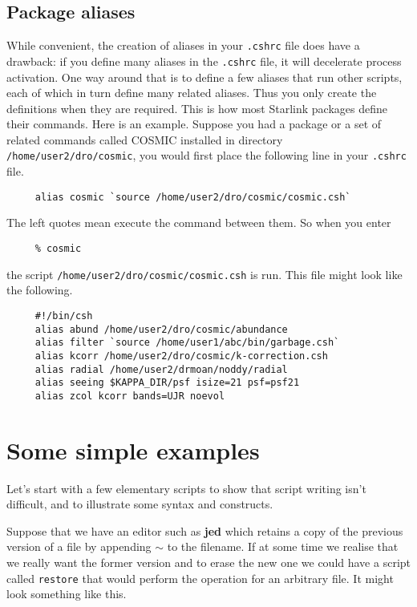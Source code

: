 \documentclass[twoside,11pt]{article}
\newcommand{\htmlref}[2]{#1}
\newcommand{\xlabel}[1]{}
\begin{document}
\subsection{\xlabel{sc4_se_package}Package aliases\label{sc4_se_package}}

While convenient, the creation of aliases in your {\tt .cshrc} file
does have a drawback: if you define many aliases in the {\tt .cshrc}
file, it will decelerate \htmlref{{\sf process}}{sc4_gl_pro} activation.
One way around that is to define a few aliases that run other scripts,
each of which in turn define many related aliases.  Thus you only
create the definitions when they are required.  This is how most
Starlink packages define their commands.  Here is an example.  Suppose
you had a package or a set of related commands called COSMIC installed
in directory {\tt /home/user2/dro/cosmic}, you would first place the
following line in your {\tt .cshrc} file.

\small
\begin{verbatim}
     alias cosmic `source /home/user2/dro/cosmic/cosmic.csh`
\end{verbatim}
\normalsize
The left quotes mean execute the command between them.  So when you
enter

\small
\begin{verbatim}
     % cosmic
\end{verbatim}
\normalsize
the script {\tt /home/user2/dro/cosmic/cosmic.csh} is run.  This file
might look like the following.

\small
\begin{verbatim}
     #!/bin/csh
     alias abund /home/user2/dro/cosmic/abundance
     alias filter `source /home/user1/abc/bin/garbage.csh`
     alias kcorr /home/user2/dro/cosmic/k-correction.csh
     alias radial /home/user2/drmoan/noddy/radial
     alias seeing $KAPPA_DIR/psf isize=21 psf=psf21
     alias zcol kcorr bands=UJR noevol
\end{verbatim}
\normalsize

\newpage
\section{\xlabel{sc4_se_simple}Some simple examples\label{sc4_se_simple}}

Let's start with a few elementary scripts to show that script writing
isn't difficult, and to illustrate some syntax and constructs.

Suppose that we have an editor such as {\bf jed} which retains a copy
of the previous version of a file by appending {\tt $\sim$} to the
filename.  If at some time we realise that we really want the former
version and to erase the new one we could have a script called
{\tt restore} that would perform the operation for an arbitrary file.
It might look something like this.
\end{document}
